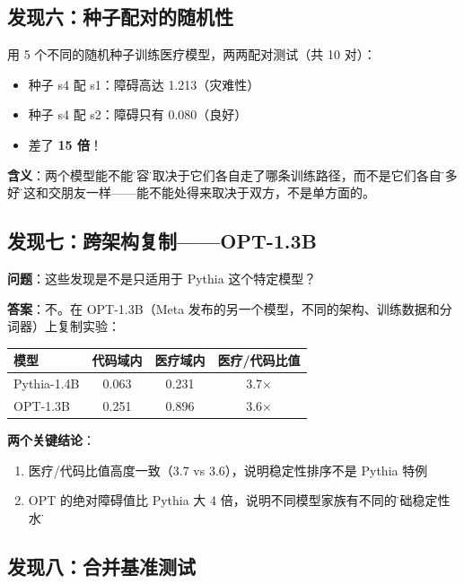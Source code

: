 \documentclass[12pt,a4paper]{article}
\begin{document}
\subsection{发现六：种子配对的随机性}

用 5 个不同的随机种子训练医疗模型，两两配对测试（共 10 对）：

\begin{itemize}
    \item 种子 s4 配 s1：障碍高达 1.213（灾难性）
    \item 种子 s4 配 s2：障碍只有 0.080（良好）
    \item 差了 \textbf{15 倍}！
\end{itemize}

\textbf{含义}：两个模型能不能\"兼容\"，取决于它们各自走了哪条训练路径，而不是它们各自\"有多好\"。这和交朋友一样——能不能处得来取决于双方，不是单方面的。

\subsection{发现七：跨架构复制——OPT-1.3B}

\begin{keybox}
\textbf{问题}：这些发现是不是只适用于 Pythia 这个特定模型？

\textbf{答案}：不。在 OPT-1.3B（Meta 发布的另一个模型，不同的架构、训练数据和分词器）上复制实验：

\begin{center}
\begin{tabular}{@{}lccc@{}}
\toprule
\textbf{模型} & \textbf{代码域内} & \textbf{医疗域内} & \textbf{医疗/代码比值} \\
\midrule
Pythia-1.4B & 0.063 & 0.231 & 3.7$\times$ \\
OPT-1.3B    & 0.251 & 0.896 & 3.6$\times$ \\
\bottomrule
\end{tabular}
\end{center}

\textbf{两个关键结论}：
\begin{enumerate}
    \item 医疗/代码比值高度一致（3.7 vs 3.6），说明稳定性排序不是 Pythia 特例
    \item OPT 的绝对障碍值比 Pythia 大 4 倍，说明不同模型家族有不同的\"基础稳定性水平\"
\end{enumerate}
\end{keybox}

\subsection{发现八：合并基准测试}
\end{document}

